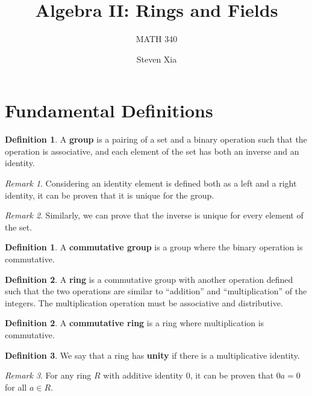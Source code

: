 \documentclass[
    parskip=half,
    toc=flat,
    toc=sectionentrydotfill,
]{scrartcl}  %
\title{Algebra II: Rings and Fields}
\subtitle{MATH 340}
\author{Steven Xia}
\theoremstyle{definition}
\newtheorem{definition}{Definition}[section]
\newtheorem{subdefinition}{Definition}[definition]
\theoremstyle{plain}
\theoremstyle{remark}
\newtheorem{remark}{Remark}[definition]
\begin{document}
\maketitle

\tableofcontents


\section{Fundamental Definitions}


\begin{definition}
    A \textbf{group} is a pairing of a set and a binary operation such that the
    operation is associative, and each element of the set has both an inverse
    and an identity.
\end{definition}

\begin{remark}
    Considering an identity element is defined both as a left and a right
    identity, it can be proven that it is unique for the group.
\end{remark}

\begin{remark}
    Similarly, we can prove that the inverse is unique for every element of the set.
\end{remark}

\begin{subdefinition}
    A \textbf{commutative group} is a group where the binary operation is
    commutative.
\end{subdefinition}

\begin{definition}
    A \textbf{ring} is a commutative group with another operation defined such
    that the two operations are similar to ``addition'' and ``multiplication''
    of the integers.
    The multiplication operation must be associative and distributive.
\end{definition}

\begin{subdefinition}
    A \textbf{commutative ring} is a ring where multiplication is commutative.
\end{subdefinition}

\begin{subdefinition}
    We say that a ring has \textbf{unity} if there is a multiplicative identity.
\end{subdefinition}

\begin{remark}
    \label{rem:zero multiply}
    For any ring $R$ with additive identity 0, it can be proven that $0a=0$ for
    all $a\in R$.
\end{remark}
\end{document}
